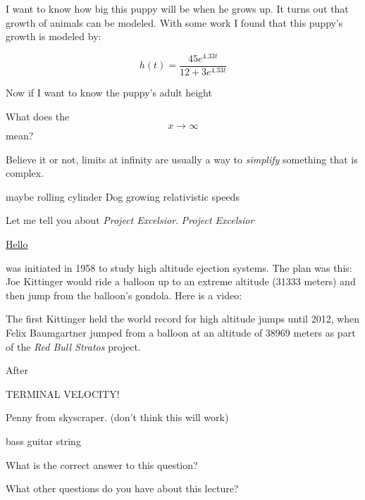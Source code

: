 \documentclass{ximera}
\begin{document}
I want to know how big this puppy will be when he grows up. It turns
out that growth of animals can be modeled. With some work I found that
this puppy's growth is modeled by:

\[
h(t) = \frac{45 e^{4.33 t}}{12+3 e^{4.33 t}}
\]

Now if I want to know the puppy's adult height


\begin{question}
What does the
\[
x\to \infty
\]
mean?
\begin{multipleChoice}
\end{multipleChoice}
\end{question}


Believe it or not, limits at infinity are usually a way to
\textit{simplify} something that is complex.

maybe rolling cylinder
Dog growing
relativistic speeds


Let me tell you about \textit{Project Excelsior}. \textit{Project
  Excelsior}

\href{http://en.wikipedia.org/wiki/Project_Excelsior}{Hello}

was initiated in 1958 to study high altitude ejection systems. The plan
was this: Joe Kittinger would ride a balloon up to an extreme altitude
(31333 meters) and then jump from the balloon's gondola. Here is a
video: 



The first 
Kittinger held the world record for high altitude jumps until 2012,
when Felix Baumgartner jumped from a balloon at an altitude of 38969
meters as part of the \textit{Red Bull Stratos} project.

After 


TERMINAL VELOCITY!


Penny from skyscraper. (don't think this will work)


bass guitar string


\begin{question}
  What is the correct answer to this question?

  \begin{solution}
    \begin{multiple-choice}
    \end{multiple-choice}  
  \end{solution}
\end{question}


\begin{question}
What other questions do you have about this lecture?
\begin{freeResponse}
\end{freeResponse}
\end{question}
\end{document}
